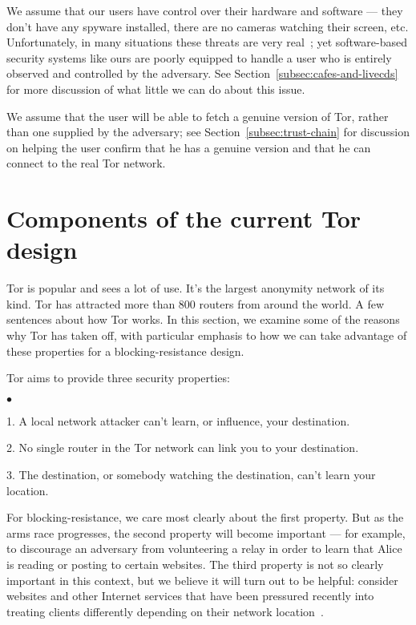 \documentclass{llncs}
\newenvironment{tightlist}{\begin{list}{$\bullet$}{
  \setlength{\itemsep}{0mm}
    \setlength{\parsep}{0mm}
    }}{\end{list}}
\begin{document}
We assume that our users have control over their hardware and
software --- they don't have any spyware installed, there are no
cameras watching their screen, etc. Unfortunately, in many situations
these threats are very real~\cite{zuckerman-threatmodels}; yet
software-based security systems like ours are poorly equipped to handle
a user who is entirely observed and controlled by the adversary. See
Section~\ref{subsec:cafes-and-livecds} for more discussion of what little
we can do about this issue.

We assume that the user will be able to fetch a genuine
version of Tor, rather than one supplied by the adversary; see
Section~\ref{subsec:trust-chain} for discussion on helping the user
confirm that he has a genuine version and that he can connect to the
real Tor network.

\section{Components of the current Tor design}
\label{sec:current-tor}

Tor is popular and sees a lot of use. It's the largest anonymity
network of its kind.
Tor has attracted more than 800 routers from around the world.
A few sentences about how Tor works.
In this section, we examine some of the reasons why Tor has taken off,
with particular emphasis to how we can take advantage of these properties
for a blocking-resistance design.

Tor aims to provide three security properties:
\begin{tightlist}
\item 1. A local network attacker can't learn, or influence, your
destination.
\item 2. No single router in the Tor network can link you to your
destination.
\item 3. The destination, or somebody watching the destination,
can't learn your location.
\end{tightlist}

For blocking-resistance, we care most clearly about the first
property. But as the arms race progresses, the second property
will become important --- for example, to discourage an adversary
from volunteering a relay in order to learn that Alice is reading
or posting to certain websites. The third property is not so clearly
important in this context, but we believe it will turn out to be helpful:
consider websites and other Internet services that have been pressured
recently into treating clients differently depending on their network
location~\cite{google-geolocation}.
\end{document}
